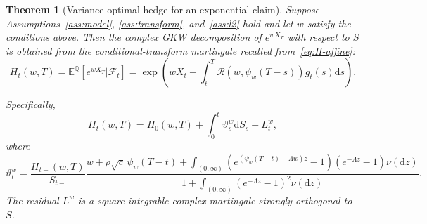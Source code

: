 \documentclass[11pt]{article}
\newtheorem{theorem}{Theorem}[section]
\theoremstyle{definition}
\theoremstyle{remark}
\newcommand{\E}{\mathbb{E}}
\newcommand{\Q}{\mathbb{Q}}
\newcommand{\F}{\mathcal{F}}
\newcommand{\Rr}{\mathcal{R}}
\newcommand{\1}{\mathbf{1}}
\newcommand{\dd}{\mathrm{d}}
\begin{document}
\begin{theorem}[Variance-optimal hedge for an exponential claim]
\label{thm:exponential-gkw}
Suppose Assumptions~\ref{ass:model}, \ref{ass:transform}, and~\ref{ass:l2}
hold and let $w$ satisfy the conditions above. Then the complex GKW
decomposition of $e^{wX_T}$ with respect to $S$ is obtained from the
conditional-transform martingale recalled from~\eqref{eq:H-affine}:
\[
 H_t(w,T)=\E^\Q[e^{wX_T}|\F_t]
 =\exp\left(
   wX_t+\int_t^T\Rr(w,\psi_w(T-s))g_t(s)\dd s
 \right).
\]
\begin{samepage}
Specifically,
\begin{equation}
\label{eq:gkw-exponential}
 H_t(w,T)=H_0(w,T)+\int_0^t\vartheta_s^w\dd S_s+L_t^w,
\end{equation}
where
\begin{equation}
 \vartheta_t^w=
 \frac{H_{t-}(w,T)}{S_{t-}}
 \frac{
   w+\rho\sqrt c\,\psi_w(T-t)
   +\displaystyle\int_{(0,\infty)}
      \left(e^{(\psi_w(T-t)-\Lambda w)z}-1\right)
      \left(e^{-\Lambda z}-1\right)\nu(\dd z)
 }{
   1+\displaystyle\int_{(0,\infty)}
      \left(e^{-\Lambda z}-1\right)^2\nu(\dd z)
 }.
\label{eq:theta-explicit}
\end{equation}
The residual $L^w$ is a square-integrable complex martingale strongly
orthogonal to $S$.
\end{samepage}
\end{theorem}
\end{document}
